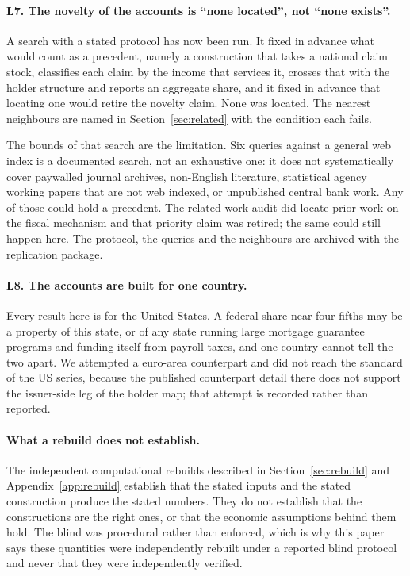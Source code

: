 \paragraph{L7. The novelty of the accounts is ``none located'', not ``none exists''.} A search
with a stated protocol has now been run. It fixed in advance what would count as a precedent,
namely a construction that takes a national claim stock, classifies each claim by the income that
services it, crosses that with the holder structure and reports an aggregate share, and it fixed
in advance that locating one would retire the novelty claim. None was located. The nearest
neighbours are named in Section~\ref{sec:related} with the condition each fails.

The bounds of that search are the limitation. Six queries against a general web index is a
documented search, not an exhaustive one: it does not systematically cover paywalled journal
archives, non-English literature, statistical agency working papers that are not web indexed, or
unpublished central bank work. Any of those could hold a precedent. The related-work audit did
locate prior work on the fiscal mechanism and that priority claim was retired; the same could
still happen here. The protocol, the queries and the neighbours are archived with the replication
package.

\paragraph{L8. The accounts are built for one country.} Every result here is for the United
States. A federal share near four fifths may be a property of this state, or of any state running
large mortgage guarantee programs and funding itself from payroll taxes, and one country cannot
tell the two apart. We attempted a euro-area counterpart and did not reach the standard of the US
series, because the published counterpart detail there does not support the issuer-side leg of
the holder map; that attempt is recorded rather than reported.

\paragraph{What a rebuild does not establish.} The independent computational rebuilds described
in Section~\ref{sec:rebuild} and Appendix~\ref{app:rebuild} establish that the stated inputs and
the stated construction produce the stated numbers. They do not establish that the constructions
are the right ones, or that the economic assumptions behind them hold. The blind was procedural
rather than enforced, which is why this paper says these quantities were independently rebuilt
under a reported blind protocol and never that they were independently verified.

